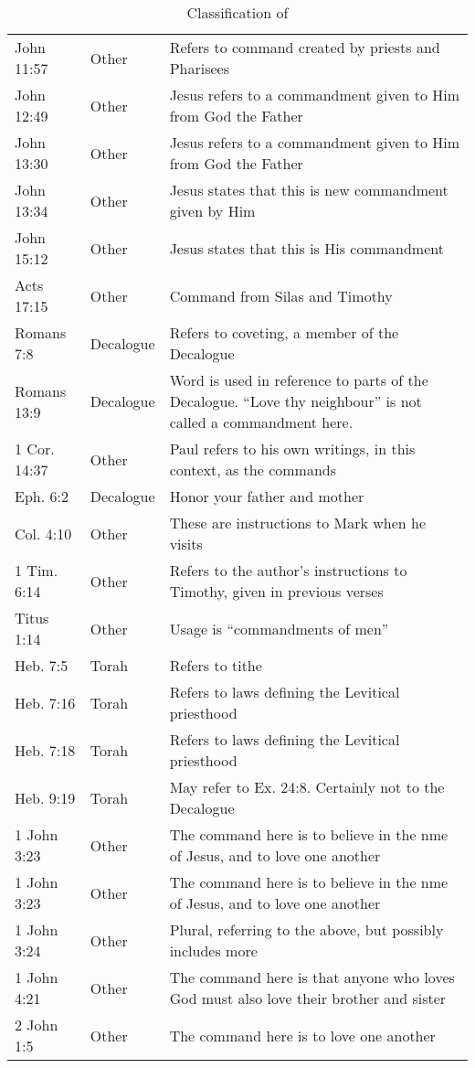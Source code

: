 \documentclass{article}
\newcommand{\entole}{\textepsilon\textnu\texttau\textomikron\textlambda\textepsilon\xspace}
\begin{document}
\begin{table}
\begin{tabularx}{\textwidth}{@{}llX@{}}
    John 11:57 & Other & Refers to command created by priests and Pharisees\\
    John 12:49 & Other & Jesus refers to a commandment given to Him from God the Father\\
    John 13:30 & Other & Jesus refers to a commandment given to Him from God the Father\\
    John 13:34 & Other & Jesus states that this is new commandment given by Him\\
    John 15:12 & Other & Jesus states that this is His commandment\\
    Acts 17:15 & Other & Command from Silas and Timothy\\
    Romans 7:8 & Decalogue & Refers to coveting, a member of the Decalogue\\
    Romans 13:9 & Decalogue & Word is used in reference to parts of the Decalogue.  ``Love thy neighbour'' is not called a commandment here.\\
    1 Cor. 14:37 & Other & Paul refers to his own writings, in this context, as the commands\\
    Eph. 6:2 & Decalogue & Honor your father and mother\\
    Col. 4:10 & Other & These are instructions to Mark when he visits\\
    1 Tim. 6:14 & Other & Refers to the author's instructions to Timothy, given in previous verses\\
    Titus 1:14 & Other & Usage is ``commandments of men''\\
    Heb. 7:5 & Torah & Refers to tithe\\
    Heb. 7:16 & Torah & Refers to laws defining the Levitical priesthood\\
    Heb. 7:18 & Torah & Refers to laws defining the Levitical priesthood\\
    Heb. 9:19 & Torah & May refer to Ex. 24:8.  Certainly not to the Decalogue\\
    1 John 3:23 & Other & The command here is to believe in the nme of Jesus, and to love one another\\
    1 John 3:23 & Other & The command here is to believe in the nme of Jesus, and to love one another\\
    1 John 3:24 & Other & Plural, referring to the above, but possibly includes more\\
    1 John 4:21 & Other & The command here is that anyone who loves God must also love their brother and sister\\
    2 John 1:5 & Other & The command here is to love one another\\
    \bottomrule
\end{tabularx}
    \caption{Classification of \entole}
    \label{training}
\end{table}
\end{document}
